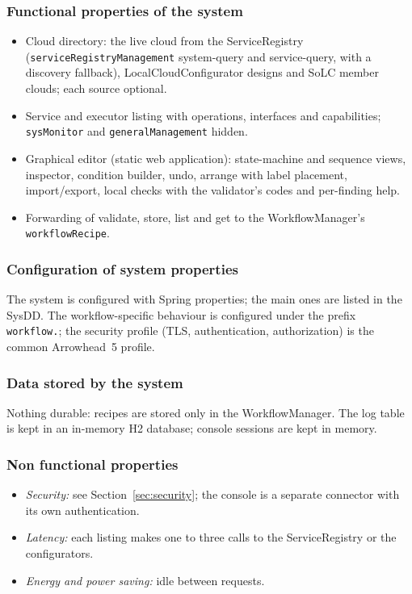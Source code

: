 \documentclass[a4paper]{arrowhead}
\begin{document}
\subsubsection{Functional properties of the system}
\begin{itemize}
\item Cloud directory: the live cloud from the ServiceRegistry (\texttt{serviceRegistryManagement} system-query and
service-query, with a discovery fallback), LocalCloudConfigurator designs and SoLC member clouds; each source optional.
\item Service and executor listing with operations, interfaces and capabilities; \texttt{sysMonitor} and
\texttt{generalManagement} hidden.
\item Graphical editor (static web application): state-machine and sequence views, inspector, condition builder,
undo, arrange with label placement, import/export, local checks with the validator's codes and per-finding help.
\item Forwarding of validate, store, list and get to the WorkflowManager's \texttt{workflowRecipe}.
\end{itemize}

\subsubsection{Configuration of system properties}
The system is configured with Spring properties; the main ones are listed in the SysDD. The workflow-specific behaviour
is configured under the prefix \texttt{workflow.}; the security profile (TLS, authentication, authorization) is the
common Arrowhead~5 profile.

\subsubsection{Data stored by the system}
Nothing durable: recipes are stored only in the WorkflowManager. The log table is kept in an in-memory H2 database;
console sessions are kept in memory.

\subsubsection{Non functional properties}
\begin{itemize}
\item \emph{Security:} see Section~\ref{sec:security}; the console is a separate connector with its own authentication.
\item \emph{Latency:} each listing makes one to three calls to the ServiceRegistry or the configurators.
\item \emph{Energy and power saving:} idle between requests.
\end{itemize}
\end{document}

